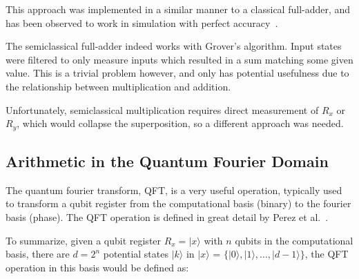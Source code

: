 \documentclass[twocolumn]{cinc}
\begin{document}
  This approach was implemented in a similar manner to a classical full-adder,
  and has been observed to work in simulation with perfect accuracy~\cite{quantum_full_adder}.

  The semiclassical full-adder indeed works with Grover's algorithm. Input states were
  filtered to only measure inputs which resulted in a sum matching some given value.
  This is a trivial problem however, and only has potential usefulness due to the 
  relationship between multiplication and addition.

  Unfortunately, semiclassical multiplication requires direct measurement of $R_x$
  or $R_y$, which would collapse the superposition, so a different approach was
  needed.


  \subsection{Arithmetic in the Quantum Fourier Domain}\label{sec:qft_arithmetic} 

  The quantum fourier transform, QFT, is a very useful
  operation, typically used to transform a qubit register from the
  computational basis (binary) to the fourier basis (phase).  The QFT operation 
  is defined in great detail by Perez et al.~\cite{quantum_arithmetic}. 
  
  To summarize, given a qubit register $R_x=|x\rangle$
  with $n$ qubits in the computational basis, there are $d=2^n$ potential states $|k\rangle$
  in $|x\rangle$ = $\{|0\rangle, |1\rangle, \ldots, |d-1\rangle\}$, the QFT operation in this
  basis would be defined as:
\end{document}
